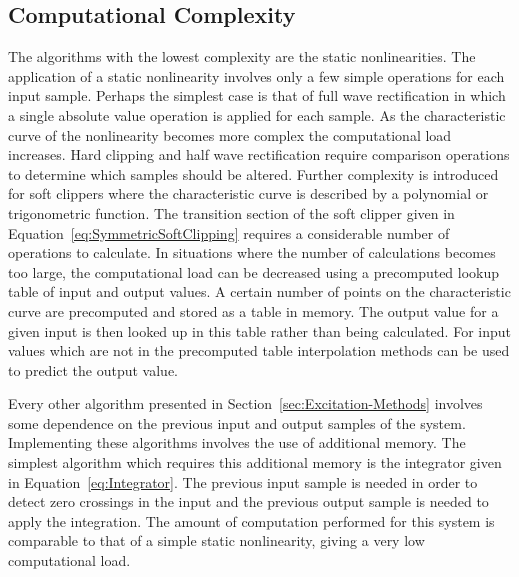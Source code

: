 	\subsection{Computational Complexity}
	\label{sec:ExcitationEvaluation-Comparison-Complexity}
		The algorithms with the lowest complexity are the static nonlinearities. The application of a static
		nonlinearity involves only a few simple operations for each input sample. Perhaps the simplest case is that
		of full wave rectification in which a single absolute value operation is applied for each sample. As the
		characteristic curve of the nonlinearity becomes more complex the computational load increases. Hard
		clipping and half wave rectification require comparison operations to determine which samples should be
		altered. Further complexity is introduced for soft clippers where the characteristic curve is described by
		a polynomial or trigonometric function. The transition section of the soft clipper given in
		Equation~\ref{eq:SymmetricSoftClipping} requires a considerable number of operations to calculate. In
		situations where the number of calculations becomes too large, the computational load can be decreased
		using a precomputed lookup table of input and output values. A certain number of points on the
		characteristic curve are precomputed and stored as a table in memory. The output value for a given input is
		then looked up in this table rather than being calculated. For input values which are not in the
		precomputed table interpolation methods can be used to predict the output value.

		Every other algorithm presented in Section~\ref{sec:Excitation-Methods} involves some dependence on the
		previous input and output samples of the system. Implementing these algorithms involves the use of
		additional memory. The simplest algorithm which requires this additional memory is the integrator given in
		Equation~\ref{eq:Integrator}. The previous input sample is needed in order to detect zero crossings in the
		input and the previous output sample is needed to apply the integration. The amount of computation
		performed for this system is comparable to that of a simple static nonlinearity, giving a very low
		computational load.

